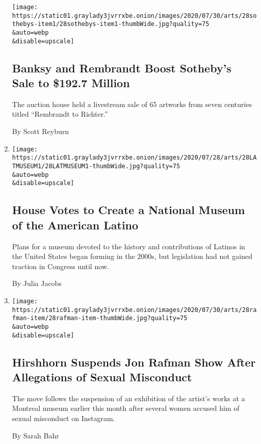 \begin{enumerate}
  \texttt{[image: https://static01.graylady3jvrrxbe.onion/images/2020/07/30/arts/28sothebys-item1/28sothebys-item1-thumbWide.jpg?quality=75\\\&auto=webp\\\&disable=upscale]}

  \hypertarget{banksy-and-rembrandt-boost-sothebys-sale-to-1927-million}{%
  \subsection{Banksy and Rembrandt Boost Sotheby's Sale to \$192.7
  Million}\label{banksy-and-rembrandt-boost-sothebys-sale-to-1927-million}}

  The auction house held a livestream sale of 65 artworks from seven
  centuries titled ``Rembrandt to Richter.''

  By Scott Reyburn
\item
  \href{/2020/07/28/arts/design/national-museum-of-the-american-latino.html}{}

  \texttt{[image: https://static01.graylady3jvrrxbe.onion/images/2020/07/28/arts/28LATMUSEUM1/28LATMUSEUM1-thumbWide.jpg?quality=75\\\&auto=webp\\\&disable=upscale]}

  \hypertarget{house-votes-to-create-a-national-museum-of-the-american-latino}{%
  \subsection{House Votes to Create a National Museum of the American
  Latino}\label{house-votes-to-create-a-national-museum-of-the-american-latino}}

  Plans for a museum devoted to the history and contributions of Latinos
  in the United States began forming in the 2000s, but legislation had
  not gained traction in Congress until now.

  By Julia Jacobs
\item
  \href{/2020/07/28/arts/design/hirshhorn-museum-jon-rafman.html}{}

  \texttt{[image: https://static01.graylady3jvrrxbe.onion/images/2020/07/30/arts/28rafman-item/28rafman-item-thumbWide.jpg?quality=75\\\&auto=webp\\\&disable=upscale]}

  \hypertarget{hirshhorn-suspends-jon-rafman-show-after-allegations-of-sexual-misconduct}{%
  \subsection{Hirshhorn Suspends Jon Rafman Show After Allegations of
  Sexual
  Misconduct}\label{hirshhorn-suspends-jon-rafman-show-after-allegations-of-sexual-misconduct}}

  The move follows the suspension of an exhibition of the artist's works
  at a Montreal museum earlier this month after several women accused
  him of sexual misconduct on Instagram.

  By Sarah Bahr
\end{enumerate}

